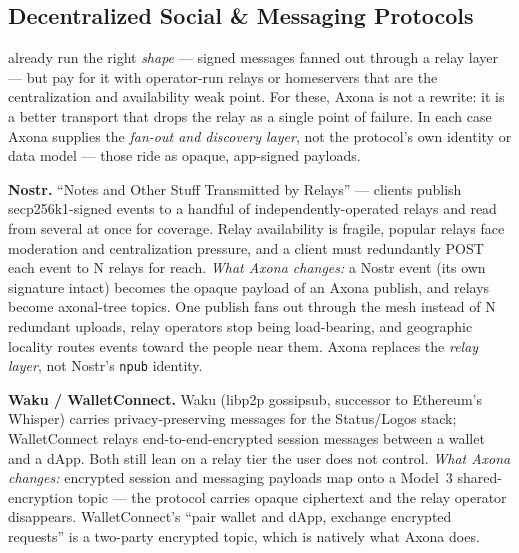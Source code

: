 \documentclass[nobib]{tufte-handout}
\begin{document}
\subsection{Decentralized Social \& Messaging Protocols}

 already run the right \emph{shape}
--- signed messages fanned out through a relay layer --- but pay for it
with operator-run relays or homeservers that are the centralization and
availability weak point. For these, Axona is not a rewrite: it is a
better transport that drops the relay as a single point of failure. In
each case Axona supplies the \emph{fan-out and discovery layer}, not the
protocol's own identity or data model --- those ride as opaque,
app-signed payloads.

\textbf{Nostr.} ``Notes and Other Stuff Transmitted by Relays'' ---
clients publish secp256k1-signed events to a handful of
independently-operated relays and read from several at once for
coverage. Relay availability is fragile, popular relays face moderation
and centralization pressure, and a client must redundantly POST each
event to N relays for reach. \emph{What Axona changes:} a Nostr event
(its own signature intact) becomes the opaque payload of an Axona
publish, and relays become axonal-tree topics. One publish fans out
through the mesh instead of N redundant uploads, relay operators stop
being load-bearing, and geographic locality routes events toward the
people near them. Axona replaces the \emph{relay layer}, not Nostr's
\texttt{npub} identity.

\textbf{Waku / WalletConnect.} Waku (libp2p gossipsub, successor to
Ethereum's Whisper) carries privacy-preserving messages for the
Status/Logos stack; WalletConnect relays end-to-end-encrypted session
messages between a wallet and a dApp. Both still lean on a relay tier
the user does not control. \emph{What Axona changes:} encrypted session
and messaging payloads map onto a Model~3 shared-encryption topic --- the
protocol carries opaque ciphertext and the relay operator disappears.
WalletConnect's ``pair wallet and dApp, exchange encrypted requests'' is
a two-party encrypted topic, which is natively what Axona does.
\end{document}
